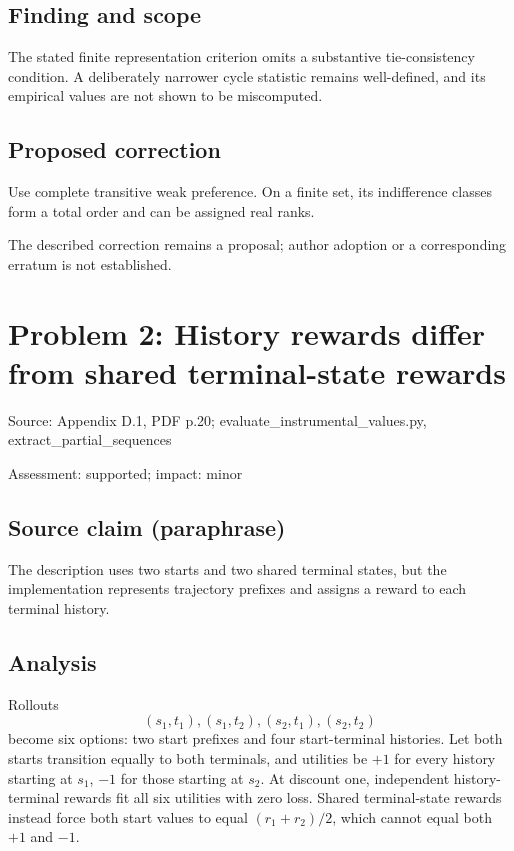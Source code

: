 \documentclass[11pt]{article}
\begin{document}
\subsection*{Finding and scope}

The stated finite representation criterion omits a substantive tie-consistency condition. A deliberately narrower cycle statistic remains well-defined, and its empirical values are not shown to be miscomputed.

\subsection*{Proposed correction}

Use complete transitive weak preference. On a finite set, its indifference classes form a total order and can be assigned real ranks.

The described correction remains a proposal; author adoption or a corresponding erratum is not established.

\section*{Problem 2: History rewards differ from shared terminal-state rewards}

Source: Appendix D.1, PDF p.20; evaluate\_instrumental\_values.py, extract\_partial\_sequences

Assessment: supported; impact: minor

\subsection*{Source claim (paraphrase)}

The description uses two starts and two shared terminal states, but the implementation represents trajectory prefixes and assigns a reward to each terminal history.

\subsection*{Analysis}

Rollouts \[(s_1,t_1),(s_1,t_2),(s_2,t_1),(s_2,t_2)\] become six options: two start prefixes and four start-terminal histories. Let both starts transition equally to both terminals, and utilities be \(+1\) for every history starting at \(s_1\), \(-1\) for those starting at \(s_2\). At discount one, independent history-terminal rewards fit all six utilities with zero loss. Shared terminal-state rewards instead force both start values to equal \((r_1+r_2)/2\), which cannot equal both \(+1\) and \(-1\).
\end{document}
